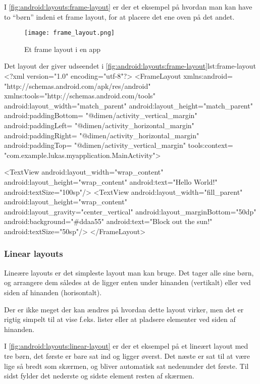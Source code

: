 I \autoref{fig:android:layouts:frame-layout} er der et eksempel på hvordan man 
kan have to ``børn'' indeni et frame layout, for at placere det ene oven på det 
andet.

\begin{figure}[h]
	\begin{center}
		\texttt{[image: frame\_layout.png]}
		\caption{Et frame layout i en app}
		\label{fig:android:layouts:frame-layout}
	\end{center}
\end{figure}

\begin{XmlCode}{Det layout der giver udseendet i \autoref{fig:android:layouts:frame-layout}}{lst:frame-layout}
	<?xml version="1.0" encoding="utf-8"?>
	<FrameLayout 
		xmlns:android=
			"http://schemas.android.com/apk/res/android"
		xmlns:tools="http://schemas.android.com/tools"
		android:layout_width="match_parent"
		android:layout_height="match_parent"
		android:paddingBottom=
			"@dimen/activity_vertical_margin"
		android:paddingLeft=
			"@dimen/activity_horizontal_margin"
		android:paddingRight=
			"@dimen/activity_horizontal_margin"
		android:paddingTop=
			"@dimen/activity_vertical_margin"
		tools:context=
			"com.example.lukas.myapplication.MainActivity">
	
		<TextView
			android:layout_width="wrap_content"
			android:layout_height="wrap_content"
			android:text="Hello World!"
			android:textSize="100sp"/>
		<TextView
			android:layout_width="fill_parent"
			android:layout_height="wrap_content"
			android:layout_gravity="center_vertical"
			android:layout_marginBottom="50dp"
			android:background="#ddaa55"
			android:text="Block out the sun!"
			android:textSize="50sp"/>
	</FrameLayout>
\end{XmlCode}

\clearpage
\FloatBarrier

\subsubsection{Linear layouts}
Lineære layouts er det simpleste layout man kan bruge. Det tager alle sine 
børn, og arrangere dem således at de ligger enten under hinanden (vertikalt) 
eller ved siden af hinanden (horisontalt).

Der er ikke meget der kan ændres på hvordan dette layout virker, men det er 
rigtig simpelt til at vise f.eks. lister eller at pladsere elementer ved siden 
af hinanden.

I \autoref{fig:android:layouts:linear-layout} er der et eksempel på et lineært 
layout med tre børn, det første er bare sat ind og ligger øverst. Det næste er 
sat til at være lige så bredt som skærmen, og bliver automatisk sat nedenunder 
det første. Til sidst fylder det nederste og sidste element resten af skærmen.


